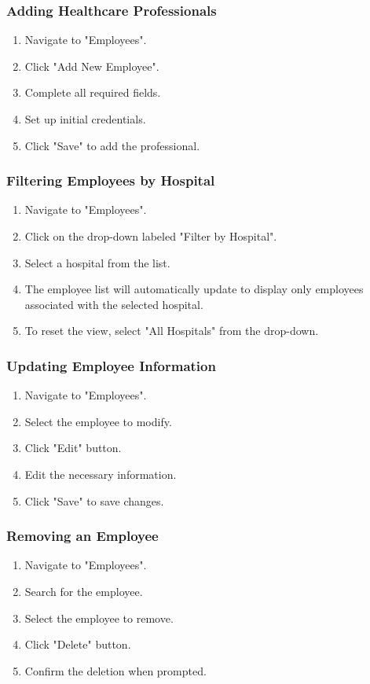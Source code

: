 \documentclass[12pt, titlepage]{article}
\begin{document}
\subsubsection{Adding Healthcare Professionals}
\begin{enumerate}
\item Navigate to "Employees".
\item Click "Add New Employee".
\item Complete all required fields.
\item Set up initial credentials.
\item Click "Save" to add the professional.
\end{enumerate}

\subsubsection{Filtering Employees by Hospital}
\begin{enumerate}
    \item Navigate to "Employees".
    \item Click on the drop-down labeled "Filter by Hospital".
    \item Select a hospital from the list.
    \item The employee list will automatically update to display only employees associated with the selected hospital.
    \item To reset the view, select "All Hospitals" from the drop-down.
\end{enumerate}

\subsubsection{Updating Employee Information}
\begin{enumerate}
\item Navigate to "Employees".
\item Select the employee to modify.
\item Click "Edit" button.
\item Edit the necessary information.
\item Click "Save" to save changes.
\end{enumerate}

\subsubsection{Removing an Employee}
\begin{enumerate}
\item Navigate to "Employees".
\item Search for the employee.
\item Select the employee to remove.
\item Click "Delete" button.
\item Confirm the deletion when prompted.
\end{enumerate}
\end{document}
